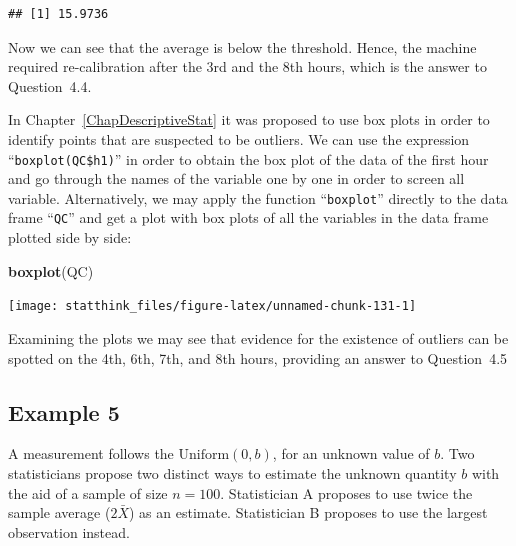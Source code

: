 \documentclass[
]{krantz}
\makeatletter
\newenvironment{Shaded}{\begin{snugshade}}{\end{snugshade}}
\newcommand{\KeywordTok}[1]{\textcolor[rgb]{0.13,0.29,0.53}{\textbf{#1}}}
\newcommand{\NormalTok}[1]{#1}
\newcommand{\OperatorTok}[1]{\textcolor[rgb]{0.81,0.36,0.00}{\textbf{#1}}}
\newenvironment{kframe}{%
\medskip{}
\setlength{\fboxsep}{.8em}
 \def\at@end@of@kframe{}%
 \ifinner\ifhmode%
  \def\at@end@of@kframe{\end{minipage}}%
  \begin{minipage}{\columnwidth}%
 \fi\fi%
 \def\FrameCommand##1{\hskip\@totalleftmargin \hskip-\fboxsep
 \colorbox{shadecolor}{##1}\hskip-\fboxsep
     \hskip-\linewidth \hskip-\@totalleftmargin \hskip\columnwidth}%
 \MakeFramed {\advance\hsize-\width
   \@totalleftmargin\z@ \linewidth\hsize
   \@setminipage}}%
 {\par\unskip\endMakeFramed%
 \at@end@of@kframe}
\renewenvironment{Shaded}{\begin{kframe}}{\end{kframe}}
\theoremstyle{definition}
\theoremstyle{definition}
\theoremstyle{definition}
\theoremstyle{remark}
\makeatother
\begin{document}
\begin{Shaded}
\end{Shaded}

\begin{verbatim}
## [1] 15.9736
\end{verbatim}

Now we can see that the average is below the threshold. Hence, the
machine required re-calibration after the 3rd and the 8th hours, which
is the answer to Question~4.4.

In Chapter~\ref{ChapDescriptiveStat} it was proposed to use box plots in
order to identify points that are suspected to be outliers. We can use
the expression ``\texttt{boxplot(QC\$h1)}'' in order to obtain the box plot of the
data of the first hour and go through the names of the variable one by
one in order to screen all variable. Alternatively, we may apply the
function ``\texttt{boxplot}'' directly to the data frame ``\texttt{QC}'' and get a plot
with box plots of all the variables in the data frame plotted side by
side:

\begin{Shaded}
\begin{Highlighting}[]
\KeywordTok{boxplot}\NormalTok{(QC)}
\end{Highlighting}
\end{Shaded}

\begin{center}\texttt{[image: statthink\_files/figure-latex/unnamed-chunk-131-1]} \end{center}

Examining the plots we may see that evidence for the existence of
outliers can be spotted on the 4th, 6th, 7th, and 8th hours, providing
an answer to Question~4.5

\hypertarget{example-5}{%
\subsection{Example 5}\label{example-5}}

A measurement follows the \(\mbox{Uniform}(0,b)\), for an unknown value of
\(b\). Two statisticians propose two distinct ways to estimate the unknown
quantity \(b\) with the aid of a sample of size \(n=100\). Statistician A
proposes to use twice the sample average (\(2 \bar X\)) as an estimate.
Statistician B proposes to use the largest observation instead.
\end{document}
